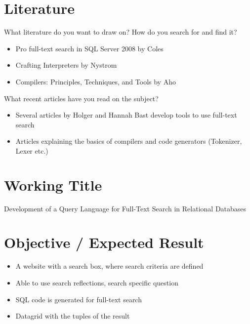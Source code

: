 \section{Literature}
What literature do you want to draw on? How do you search for and find it?
\begin{itemize}
    \item Pro full-text search in SQL Server 2008 by Coles
    \item Crafting Interpreters by Nystrom
    \item Compilers: Principles, Techniques, and Tools by Aho
\end{itemize}
What recent articles have you read on the subject?
\begin{itemize}
    \item Several articles by Holger and Hannah Bast develop tools to use full-text search
    \item Articles explaining the basics of compilers and code generators (Tokenizer, Lexer etc.)
\end{itemize}
\section{Working Title}
Development of a Query Language for Full-Text Search in Relational Databases
\section{Objective / Expected Result }
\begin{itemize}
    \item A website with a search box, where search criteria are defined
    \item Able to use search reflections, search specific question
    \item SQL code is generated for full-text search
    \item Datagrid with the tuples of the result
\end{itemize}